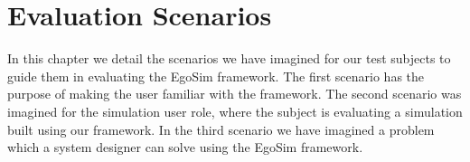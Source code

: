 \chapter{Evaluation Scenarios}\label{ch:evaluation_scenarios}
In this chapter we detail the scenarios we have imagined for our test subjects to guide them in evaluating the EgoSim framework. The first scenario has the purpose of making the user familiar with the framework. The second scenario was imagined for the simulation user role, where the subject is evaluating a simulation built using our framework. In the third scenario we have imagined a problem which a system designer can solve using the EgoSim framework.



